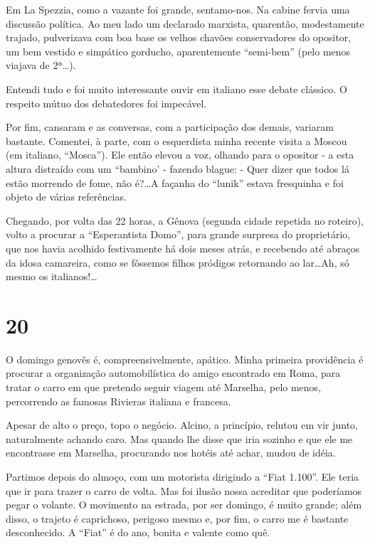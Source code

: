 Em La Spezzia, como a vazante foi grande, sentamo-nos. Na cabine fervia uma discussão política. Ao meu lado um declarado marxista, quarentão, modestamente trajado, pulverizava com boa base os velhos chavões conservadores do opositor, um bem vestido e simpático gorducho, aparentemente ``semi-bem'' (pelo menos viajava de 2ª\ldots).

Entendi tudo e foi muito interessante ouvir em italiano esse debate clássico. O respeito mútuo dos debatedores foi impecável.

Por fim, cansaram e as conversas, com a participação dos demais, variaram bastante. Comentei, à parte, com o esquerdista minha recente visita a Moscou (em italiano, ``Mosca''). Ele então elevou a voz, olhando para o opositor - a esta altura distraído com um ``bambino’ - fazendo blague: - Quer dizer que todos lá estão morrendo de fome, não é?\ldots A façanha do ``lunik'' estava fresquinha e foi objeto de várias referências.

Chegando, por volta das 22 horas, a Gênova (segunda cidade repetida no roteiro), volto a procurar a ``Esperantista Domo'', para grande surpresa do proprietário, que nos havia acolhido festivamente há dois meses atrás, e recebendo até abraços da idosa camareira, como se fôssemos filhos pródigos retornando ao lar\ldots Ah, só mesmo os italianos!\ldots

\section*{20 \adfflatleafright {}}
O domingo genovês é, compreensivelmente, apático. Minha primeira providência é procurar a organização automobilística do amigo encontrado em Roma, para tratar o carro em que pretendo seguir viagem até Marselha, pelo menos, percorrendo as famosas Rivieras italiana e francesa.

Apesar de alto o preço, topo o negócio. Alcino, a princípio, relutou em vir junto, naturalmente achando caro. Mas quando lhe disse que iria sozinho e que ele me encontrasse em Marselha, procurando nos hotéis até achar, mudou de idéia.

Partimos depois do almoço, com um motorista dirigindo a ``Fiat 1.100''. Ele teria que ir para trazer o carro de volta. Mas foi ilusão nossa acreditar que poderíamos pegar o volante. O movimento na estrada, por ser domingo, é muito grande; além disso, o trajeto é caprichoso, perigoso mesmo e, por fim, o carro me é bastante desconhecido. A ``Fiat'' é do ano, bonita e valente como quê.

